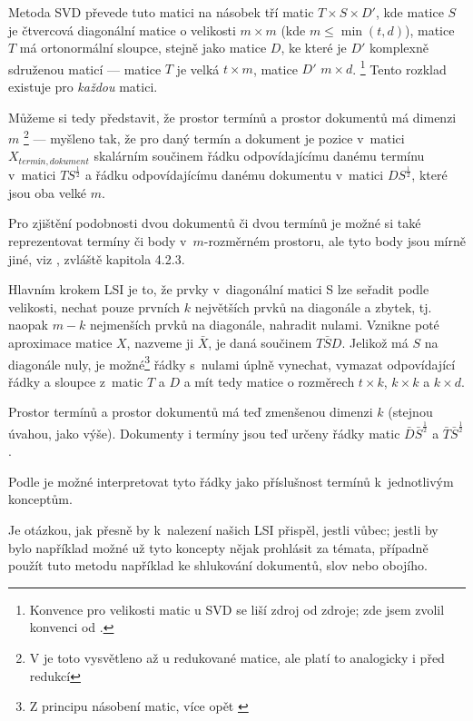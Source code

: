 \documentclass[12pt,a4paper]{report}
\begin{document}
Metoda SVD převede tuto matici na násobek tří matic $T\times S \times D'$, kde matice $S$ je čtvercová diagonální matice o velikosti $m\times m$ (kde $m\le \min\left(t, d\right)$), matice $T$ má ortonormální sloupce, stejně jako matice $D$, ke které je $D'$ komplexně sdruženou maticí --- matice $T$ je velká $t \times m$, matice $D'$ $m \times d$. \footnote{Konvence pro velikosti matic u SVD se liší zdroj od zdroje; zde jsem zvolil konvenci od \cite{lsi}.} Tento rozklad existuje pro \emph{každou} matici.

Můžeme si tedy představit, že prostor termínů a prostor dokumentů má dimenzi $m$ \footnote{V \cite{lsi} je toto vysvětleno až u redukované matice, ale platí to analogicky i před redukcí} --- myšleno tak, že pro daný termín a dokument je pozice v~matici $X_{termín, dokument}$ skalárním součinem řádku odpovídajícímu danému termínu v~matici $TS^{\frac{1}{2}}$ a řádku odpovídajícímu danému dokumentu v~matici $DS^{\frac{1}{2}}$, které jsou oba velké $m$. 

Pro zjištění podobnosti dvou dokumentů či dvou termínů je možné si také reprezentovat termíny či body v~$m$-rozměrném prostoru, ale tyto body jsou mírně jiné, viz \cite{lsi}, zvláště kapitola 4.2.3.

Hlavním krokem LSI je to, že prvky v~diagonální matici S lze seřadit podle velikosti, nechat pouze prvních $k$ největších prvků na diagonále a zbytek, tj. naopak $m-k$ nejmenších prvků na diagonále, nahradit nulami. Vznikne poté aproximace matice $X$, nazveme ji $\bar{X}$, je daná součinem $T\bar{S}D$. Jelikož má $S$ na diagonále nuly, je možné\footnote{Z principu násobení matic, více opět \cite{lsi}} řádky s~nulami úplně vynechat, vymazat odpovídající řádky a sloupce z~matic $T$ a $D$ a mít tedy matice o rozměrech $t \times k$, $k \times k$ a $k \times d$.

Prostor termínů a prostor dokumentů má teď zmenšenou dimenzi $k$ (stejnou úvahou, jako výše). Dokumenty i termíny jsou teď určeny řádky matic $\bar{D}\bar{S}^{\frac{1}{2}}$ a $\bar{T}\bar{S}^{\frac{1}{2}}$.

Podle \cite{lsi} je možné interpretovat tyto řádky jako příslušnost termínů k~jednotlivým konceptům.

Je otázkou, jak přesně by k~nalezení našich  LSI přispěl, jestli vůbec; jestli by bylo například možné už tyto koncepty nějak prohlásit za témata, případně použít tuto metodu například ke shlukování dokumentů, slov nebo obojího.

\end{document}
